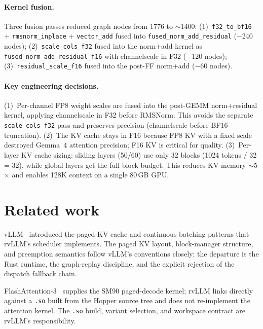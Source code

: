 \paragraph{Kernel fusion.}
Three fusion passes reduced graph nodes from 1776 to ${\sim}$1400:
(1)~\texttt{f32\_to\_bf16} + \texttt{rmsnorm\_inplace} + \texttt{vector\_add}
fused into \texttt{fused\_norm\_add\_residual} ($-$240 nodes);
(2)~\texttt{scale\_cols\_f32} fused into the norm+add kernel as
\texttt{fused\_norm\_add\_residual\_f16} with channelscale in F32 ($-$120 nodes);
(3)~\texttt{residual\_scale\_f16} fused into the post-FF norm+add ($-$60 nodes).

\paragraph{Key engineering decisions.}
(1)~Per-channel FP8 weight scales are fused into the post-GEMM
norm+residual kernel, applying channelscale in F32 before RMSNorm.
This avoids the separate \texttt{scale\_cols\_f32} pass and preserves
precision (channelscale before BF16 truncation).
(2)~The KV cache stays in F16 because FP8 KV with a fixed scale
destroyed Gemma~4 attention precision; F16 KV is critical for quality.
(3)~Per-layer KV cache sizing: sliding layers (50/60) use only 32 blocks
(1024 tokens / 32 = 32), while global layers get the full block budget.
This reduces KV memory ${\sim}$5$\times$ and enables 128K context on a single 80\,GB GPU.

\section{Related work}
\label{sec:related}

vLLM~\cite{kwon2023vllm} introduced the paged-KV cache and continuous
batching patterns that rvLLM's scheduler implements. The paged KV
layout, block-manager structure, and preemption semantics follow vLLM's
conventions closely; the departure is the Rust runtime, the graph-replay
discipline, and the explicit rejection of the dispatch fallback chain.

FlashAttention-3~\cite{shah2024flash3} supplies the SM90 paged-decode
kernel; rvLLM links directly against a \texttt{.so} built from the
Hopper source tree and does not re-implement the attention kernel. The
\texttt{.so} build, variant selection, and workspace contract are
rvLLM's responsibility.

